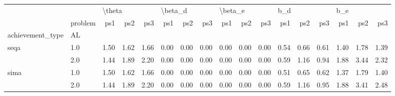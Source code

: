 \begin{tabular}{llrrrrrrrrrrrrrrr}
\toprule
     & {} & \multicolumn{3}{l}{\textbackslash theta} & \multicolumn{3}{l}{\textbackslash beta\_d} & \multicolumn{3}{l}{\textbackslash beta\_e} & \multicolumn{3}{l}{b\_d} & \multicolumn{3}{l}{b\_e} \\
     & problem &    ps1 &  ps2 &  ps3 &     ps1 &  ps2 &  ps3 &     ps1 &  ps2 &  ps3 &  ps1 &  ps2 &  ps3 &  ps1 &  ps2 &  ps3 \\
achievement\_type & AL &        &      &      &         &      &      &         &      &      &      &      &      &      &      &      \\
\midrule
seqa & 1.0 &   1.50 & 1.62 & 1.66 &    0.00 & 0.00 & 0.00 &    0.00 & 0.00 & 0.00 & 0.54 & 0.66 & 0.61 & 1.40 & 1.78 & 1.39 \\
     & 2.0 &   1.44 & 1.89 & 2.20 &    0.00 & 0.00 & 0.00 &    0.00 & 0.00 & 0.00 & 0.59 & 1.16 & 0.94 & 1.88 & 3.44 & 2.32 \\
sima & 1.0 &   1.50 & 1.62 & 1.66 &    0.00 & 0.00 & 0.00 &    0.00 & 0.00 & 0.00 & 0.51 & 0.65 & 0.62 & 1.37 & 1.79 & 1.40 \\
     & 2.0 &   1.44 & 1.89 & 2.20 &    0.00 & 0.00 & 0.00 &    0.00 & 0.00 & 0.00 & 0.59 & 1.16 & 0.95 & 1.88 & 3.41 & 2.48 \\
\bottomrule
\end{tabular}

